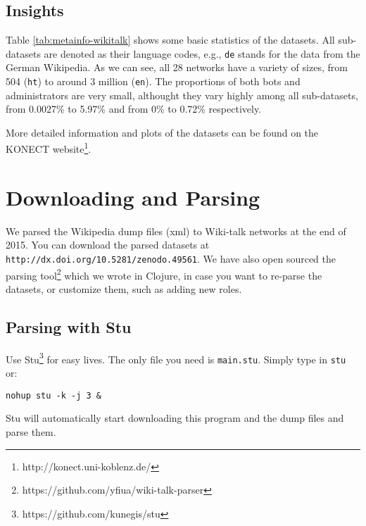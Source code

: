 \documentclass[a4paper]{article}
\begin{document}
\subsection{Insights}
    Table \ref{tab:metainfo-wikitalk} shows some basic statistics of the datasets. All sub-datasets are denoted as their language codes, e.g., \texttt{de} stands for the data from the German Wikipedia. As we can see, all 28 networks have a variety of sizes, from 504 (\texttt{ht}) to around 3 million (\texttt{en}).
    The proportions of both bots and administrators are very small, althought they vary highly among all sub-datasets, from 0.0027\% to 5.97\% and from 0\% to 0.72\% respectively.

    More detailed information and plots of the datasets can be found on the KONECT \cite{kunegis2013konect} website\footnote{http://konect.uni-koblenz.de/}.

\section{Downloading and Parsing}

We parsed the Wikipedia dump files (xml) to Wiki-talk networks at the end of 2015. You can download the parsed datasets at \texttt{http://dx.doi.org/10.5281/zenodo.49561}.
We have also open sourced the parsing tool\footnote{https://github.com/yfiua/wiki-talk-parser} which we wrote in Clojure, in case you want to re-parse the datasets, or customize them, such as adding new roles.

\subsection{Parsing with Stu}

Use Stu\footnote{https://github.com/kunegis/stu} for easy lives. The only file you need is \texttt{main.stu}. Simply type in \texttt{stu} or:

\begin{Verbatim}[commandchars=?\[\]]
    nohup stu -k -j 3 &
\end{Verbatim}

Stu will automatically start downloading this program and the dump files and parse them.
\end{document}
